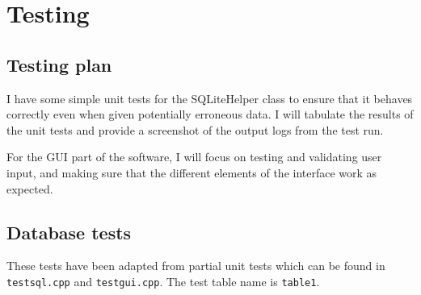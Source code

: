 \section{Testing}
\subsection{Testing plan}

I have some simple unit tests for the SQLiteHelper class to ensure that it
behaves correctly even when given potentially erroneous data. I will tabulate
the results of the unit tests and provide a screenshot of the output logs from
the test run.

For the GUI part of the software, I will focus on testing and validating user
input, and making sure that the different elements of the interface work as
expected.


\subsection{Database tests}

These tests have been adapted from partial unit tests which can be found in
\texttt{testsql.cpp} and \texttt{testgui.cpp}. The test table name is
\texttt{table1}.

